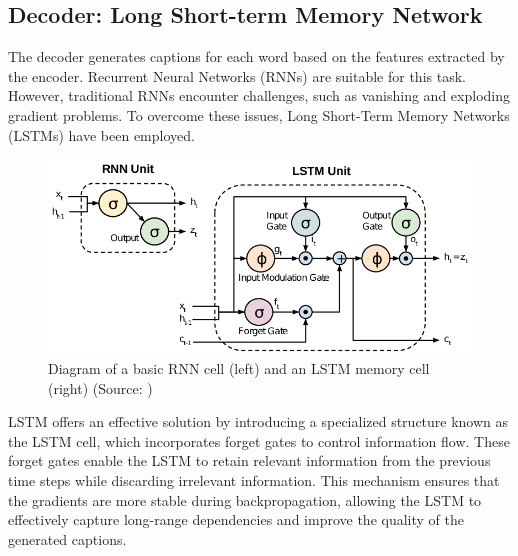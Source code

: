 \documentclass[conference]{IEEEtran}
\begin{document}


\subsection{Decoder: Long Short-term Memory Network\label{subsec:decoder}}


The decoder generates captions for each word based on the features extracted by the encoder. Recurrent Neural Networks (RNNs) are suitable for this task. However, traditional RNNs encounter challenges, such as vanishing and exploding gradient problems. To overcome these issues, Long Short-Term Memory Networks (LSTMs) \cite{hochreiter1997long} have been employed.

\begin{figure}[h]
\includegraphics[width=\columnwidth]{assets/rnnvslstm.png}
  \caption{ Diagram of a basic RNN cell (left) and an LSTM memory cell (right) (Source: \cite{DBLP:journals/corr/RassemES17})}
  \label{fig:RNN_LSTM_compare}
\end{figure}


LSTM offers an effective solution by introducing a specialized structure known as the LSTM cell, which incorporates forget gates to control information flow. These forget gates enable the LSTM to retain relevant information from the previous time steps while discarding irrelevant information. This mechanism ensures that the gradients are more stable during backpropagation, allowing the LSTM to effectively capture long-range dependencies and improve the quality of the generated captions.
\end{document}
